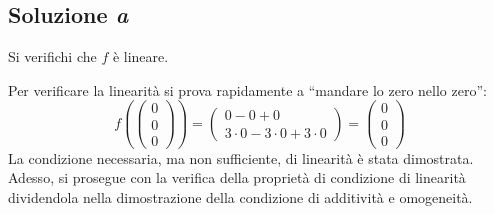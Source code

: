 \documentclass[a4paper]{article}
\newcommand{\dquotes}[1]{``#1''}
\begin{document}
	\subsection{Soluzione \emph{a}}
	
	Si verifichi che $f$ è lineare.\newline
	
	\noindent
	Per verificare la linearità si prova rapidamente a \dquotes{mandare lo zero nello zero}:
	\begin{equation*}
		f\left( \begin{pmatrix}
			0 \\ 0 \\ 0
		\end{pmatrix} \right) = \begin{pmatrix}
			0 - 0 + 0 \\
			3\cdot 0 - 3 \cdot 0 + 3 \cdot 0
		\end{pmatrix} = \begin{pmatrix}
			0 \\ 0 \\ 0
		\end{pmatrix}
	\end{equation*}
	La condizione necessaria, ma non sufficiente, di linearità è stata dimostrata. Adesso, si prosegue con la verifica della proprietà di condizione di linearità dividendola nella dimostrazione della condizione di additività e omogeneità.
\end{document}
